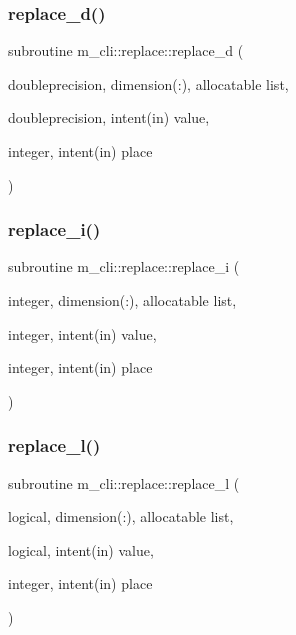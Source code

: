 \mbox{\label{interfacem__cli_1_1replace_acc8e55b73266f8ec6841359b46c032a5}} 
\subsubsection{\texorpdfstring{replace\+\_\+d()}{replace\_d()}}
{\footnotesize\ttfamily subroutine m\+\_\+cli\+::replace\+::replace\+\_\+d (\begin{DoxyParamCaption}\item[{doubleprecision, dimension(\+:), allocatable}]{list,  }\item[{doubleprecision, intent(in)}]{value,  }\item[{integer, intent(in)}]{place }\end{DoxyParamCaption})\hspace{0.3cm}{\ttfamily [private]}}

\mbox{\label{interfacem__cli_1_1replace_abc84f285072aca38fb5b9464b9ee7401}} 
\subsubsection{\texorpdfstring{replace\+\_\+i()}{replace\_i()}}
{\footnotesize\ttfamily subroutine m\+\_\+cli\+::replace\+::replace\+\_\+i (\begin{DoxyParamCaption}\item[{integer, dimension(\+:), allocatable}]{list,  }\item[{integer, intent(in)}]{value,  }\item[{integer, intent(in)}]{place }\end{DoxyParamCaption})\hspace{0.3cm}{\ttfamily [private]}}

\mbox{\label{interfacem__cli_1_1replace_ac9f0196d45313ed60d0c0368fc2fd444}} 
\subsubsection{\texorpdfstring{replace\+\_\+l()}{replace\_l()}}
{\footnotesize\ttfamily subroutine m\+\_\+cli\+::replace\+::replace\+\_\+l (\begin{DoxyParamCaption}\item[{logical, dimension(\+:), allocatable}]{list,  }\item[{logical, intent(in)}]{value,  }\item[{integer, intent(in)}]{place }\end{DoxyParamCaption})\hspace{0.3cm}{\ttfamily [private]}}

